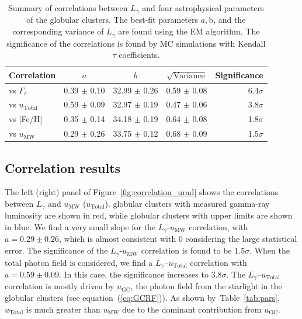 \documentclass[doublespace,nopageskip]{VTthesis}
\begin{document}
\begin{table}[htb]
\centering
\caption{Summary of correlations between $L_\gamma$ and four astrophysical parameters of the globular clusters. The best-fit parameters $a, $b, and the corresponding variance of $L_\gamma$ are found using the EM algorithm. The significance of the correlations is found by MC simulations with Kendall $\tau$ coefficients.}
\label{tab:correlation}
\begin{tabular}{lcccr}
\hline
 Correlation & $a$ & $b$ & $\sqrt{\text{Variance}}$ & Significance\\
\hline
vs $\Gamma_c$ & 0.39 $\pm$ 0.10 & 32.99 $\pm$ 0.26 & 0.59 $\pm$ 0.08 & 6.4$\sigma$\\
vs $u_{\mathrm{Total}}$ & 0.59 $\pm$ 0.09 & 32.97 $\pm$ 0.19 & 0.47 $\pm$ 0.06 & 3.8$\sigma$\\
vs [Fe/H] & 0.35 $\pm$ 0.14 & 34.18 $\pm$ 0.19 & 0.64 $\pm$ 0.08 & 1.8$\sigma$\\
vs $u_\mathrm{MW}$ & 0.29 $\pm$ 0.26 & 33.75 $\pm$ 0.12 & 0.68 $\pm$ 0.09 & 1.5$\sigma$\\
\hline
\end{tabular}
\end{table}

\subsection{Correlation results}

The left (right) panel of Figure~\ref{fig:correlation_urad} shows the correlations between $L_\gamma$ and $u_\mathrm{MW}$ ($u_\mathrm{Total}$). globular clusters with measured gamma-ray luminosity are shown in red, while globular clusters with upper limits are shown in blue. We find a very small slope for the $L_\gamma$-$u_\mathrm{MW}$ correlation, with $a=0.29 \pm 0.26$, which is almost consistent with 0 considering the large statistical error. The significance of the $L_\gamma$-$u_\mathrm{MW}$ correlation is found to be 1.5$\sigma$. When the total photon field is considered, we find a $L_\gamma$--$u_\mathrm{Total}$ correlation with $a = 0.59 \pm 0.09$. In this case, the significance increases to 3.8$\sigma$. The $L_\gamma$--$u_\mathrm{Total}$ correlation is mostly driven by $u_\mathrm{GC}$, the photon field from the starlight in the globular clusters (see equation~(\ref{eq:GCRF})). As shown by~Table~\ref{tab:pars}, $u_\mathrm{Total}$ is much greater than $u_\mathrm{MW}$ due to the dominant contribution from $u_\mathrm{GC}$. 
\end{document}

